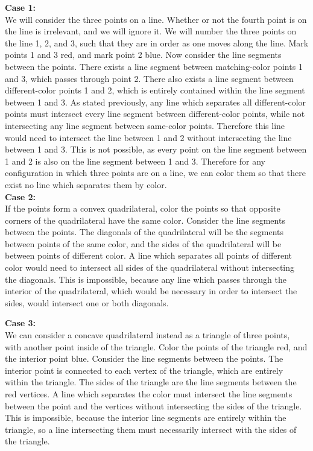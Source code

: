 \documentclass[11pt]{article}
\begin{document}
\textbf{Case 1:} \\ 
We will consider the three points on a line. Whether or not the fourth point is on the line is irrelevant, and we will ignore it. We will number the three points on the line 1, 2, and 3, such that they are in order as one moves along the line. Mark points 1 and 3 red, and mark point 2 blue. Now consider the line segments between the points. There exists a line segment between matching-color points 1 and 3, which passes through point 2. There also exists a line segment between different-color points 1 and 2, which is entirely contained within the line segment between 1 and 3. As stated previously, any line which separates all different-color points must intersect every line segment between different-color points, while not intersecting any line segment between same-color points. Therefore this line would need to intersect the line between 1 and 2 without intersecting the line between 1 and 3. This is not possible, as every point on the line segment between 1 and 2 is also on the line segment between 1 and 3. Therefore for any configuration in which three points are on a line, we can color them so that there exist no line which separates them by color. \\ 

\textbf{Case 2:} \\ 
If the points form a convex quadrilateral, color the points so that opposite corners of the quadrilateral have the same color. Consider the line segments between the points. The diagonals of the quadrilateral will be the segments between points of the same color, and the sides of the quadrilateral will be between points of different color. A line which separates all points of different color would need to intersect all sides of the quadrilateral without intersecting the diagonals. This is impossible, because any line which passes through the interior of the quadrilateral, which would be necessary in order to intersect the sides, would intersect one or both diagonals.

\textbf{Case 3:} \\ 
We can consider a concave quadrilateral instead as a triangle of three points, with another point inside of the triangle. Color the points of the triangle red, and the interior point blue. Consider the line segments between the points. The interior point is connected to each vertex of the triangle, which are entirely within the triangle. The sides of the triangle are the line segments between the red vertices. A line which separates the color must intersect the line segments between the point and the vertices without intersecting the sides of the triangle. This is impossible, because the interior line segments are entirely within the triangle, so a line intersecting them must necessarily intersect with the sides of the triangle.
\end{document}
